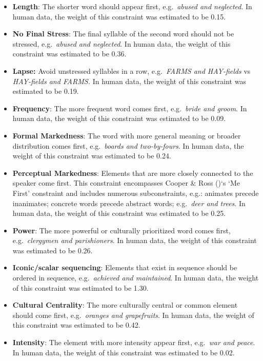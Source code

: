\documentclass[
  12pt,
  letterpaper,
]{scrreprt}
\begin{document}
\begin{itemize}
\item
  \textbf{Length}: The shorter word should appear first,
  e.g.~\emph{abused and neglected}. In human data, the weight of this
  constraint was estimated to be 0.15.
\item
  \textbf{No Final Stress}: The final syllable of the second word should
  not be stressed, e.g.~\emph{abused and neglected}. In human data, the
  weight of this constraint was estimated to be 0.36.
\item
  \textbf{Lapse:} Avoid unstressed syllables in a row, e.g.~\emph{FARMS
  and HAY-fields} vs \emph{HAY-fields and FARMS.} In human data, the
  weight of this constraint was estimated to be 0.19.
\item
  \textbf{Frequency}: The more frequent word comes first,
  e.g.~\emph{bride and groom}. In human data, the weight of this
  constraint was estimated to be 0.09.
\item
  \textbf{Formal Markedness}: The word with more general meaning or
  broader distribution comes first, e.g.~\emph{boards and two-by-fours}.
  In human data, the weight of this constraint was estimated to be 0.24.
\item
  \textbf{Perceptual Markedness}: Elements that are more closely
  connected to the speaker come first. This constraint encompasses
  Cooper \& Ross ()`s `Me
  First' constraint and includes numerous subconstraints, e.g.: animates
  precede inanimates; concrete words precede abstract words;
  e.g.~\emph{deer and trees}. In human data, the weight of this
  constraint was estimated to be 0.25.
\item
  \textbf{Power}: The more powerful or culturally prioritized word comes
  first, e.g.~\emph{clergymen and parishioners}. In human data, the
  weight of this constraint was estimated to be 0.26.
\item
  \textbf{Iconic/scalar sequencing}: Elements that exist in sequence
  should be ordered in sequence, e.g.~\emph{achieved and maintained}. In
  human data, the weight of this constraint was estimated to be 1.30.
\item
  \textbf{Cultural Centrality}: The more culturally central or common
  element should come first, e.g.~\emph{oranges and grapefruits}. In
  human data, the weight of this constraint was estimated to be 0.42.
\item
  \textbf{Intensity}: The element with more intensity appear first,
  e.g.~\emph{war and peace}. In human data, the weight of this
  constraint was estimated to be 0.02.
\end{itemize}
\end{document}
